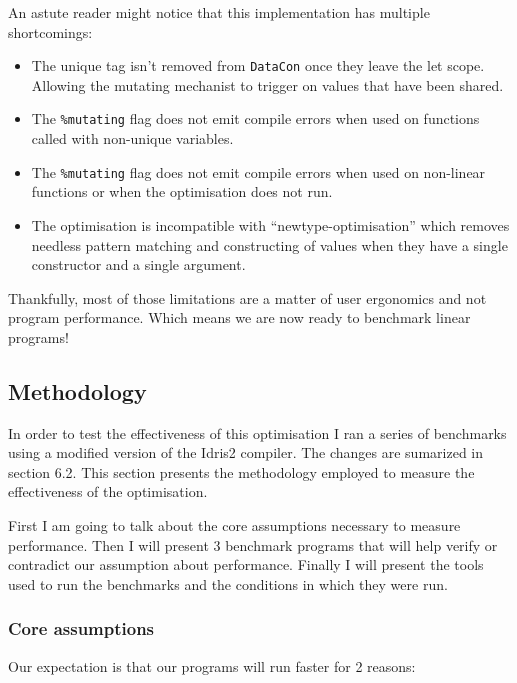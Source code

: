 \documentclass[
]{article}
\providecommand{\tightlist}{%
  \setlength{\itemsep}{0pt}\setlength{\parskip}{0pt}}
\begin{document}
An astute reader might notice that this implementation has multiple
shortcomings:

\begin{itemize}
\tightlist
\item
  The unique tag isn't removed from \texttt{DataCon} once they leave the
  let scope. Allowing the mutating mechanist to trigger on values that
  have been shared.
\item
  The \texttt{\%mutating} flag does not emit compile errors when used on
  functions called with non-unique variables.
\item
  The \texttt{\%mutating} flag does not emit compile errors when used on
  non-linear functions or when the optimisation does not run.
\item
  The optimisation is incompatible with ``newtype-optimisation'' which
  removes needless pattern matching and constructing of values when they
  have a single constructor and a single argument.
\end{itemize}

Thankfully, most of those limitations are a matter of user ergonomics
and not program performance. Which means we are now ready to benchmark
linear programs!

\hypertarget{methodology}{%
\subsection{Methodology}\label{methodology}}

In order to test the effectiveness of this optimisation I ran a series
of benchmarks using a modified version of the Idris2 compiler. The
changes are sumarized in section 6.2. This section presents the
methodology employed to measure the effectiveness of the optimisation.

First I am going to talk about the core assumptions necessary to measure
performance. Then I will present 3 benchmark programs that will help
verify or contradict our assumption about performance. Finally I will
present the tools used to run the benchmarks and the conditions in which
they were run.

\hypertarget{core-assumptions}{%
\subsubsection{Core assumptions}\label{core-assumptions}}

Our expectation is that our programs will run faster for 2 reasons:
\end{document}

